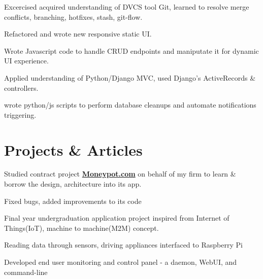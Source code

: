 \documentclass[]{deedy-resume-openfont}
\begin{document}
\begin{minipage}[t]{0.66\textwidth}
\vspace{\topsep} %
\begin{tightemize}
\item  Excercised acquired understanding of DVCS tool
  Git, learned to resolve
  merge conflicts, branching, hotfixes, stash, git-flow.
\item Refactored and wrote new responsive static UI.
\item Wrote Javascript code to handle CRUD endpoints and maniputate it for dynamic UI experience.
\item Applied understanding of Python/Django MVC, used Django's ActiveRecords \& controllers.
\item wrote python/js scripts to perform database cleanups and automate notifications triggering.
\end{tightemize}
\sectionsep




\section{Projects \& Articles}
\begin{tightemize}
\item Studied contract project \href{http://swlogs.me/blog/the-moneypot-project/}{\textbf{Moneypot.com}} on
  behalf of my firm to learn \& borrow the design, architecture into its app.
\item Fixed bugs, added improvements to its code

\end{tightemize}
\sectionsep

\descript{}
\begin{tightemize}
\item Final year undergraduation application project inspired from Internet of Things(IoT), machine to machine(M2M)
  concept.
\item Reading data through sensors, driving appliances interfaced to Raspberry Pi
\item Developed end user monitoring and control panel - a daemon, WebUI, and command-line
\end{tightemize}
\sectionsep


\end{minipage}
\end{document}
